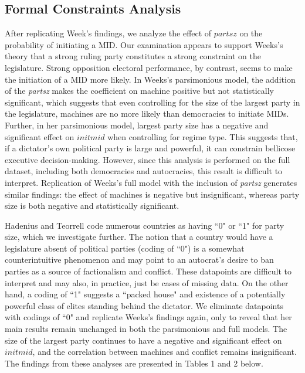 \documentclass[12pt]{article}
\begin{document}
\subsection{Formal Constraints Analysis} 

\par After replicating Week's findings, we analyze the effect of $partsz$ on the probability of initiating a MID. Our examination appears to support Weeks's theory that a strong ruling party constitutes a strong constraint on the legislature. Strong opposition electoral performance, by contrast, seems to make the initiation of a MID more likely. In Weeks's parsimonious model, the addition of the \textit{partsz} makes the coefficient on machine positive but not statistically significant, which suggests that even controlling for the size of the largest party in the legislature, machines are no more likely than democracies to initiate MIDs. Further, in her parsimonious model, largest party size has a negative and significant effect on $initmid$ when controlling for regime type. This suggests that, if a dictator's own political party is large and powerful, it can constrain bellicose executive decision-making. However, since this analysis is performed on the full dataset, including both democracies and autocracies, this result is difficult to interpret. Replication of Weeks's full model with the inclusion of \textit{partsz} generates similar findings: the effect of machines is negative but insignificant, whereas party size is both negative and statistically significant.

\par Hadenius and Teorrell code numerous countries as having ``0" or ``1" for party size, which we investigate further. The notion that a country would have a legislature absent of political parties (coding of ``0") is a somewhat counterintuitive phenomenon and may point to an autocrat's desire to ban parties as a source of factionalism and conflict. These datapoints are difficult to interpret and may also, in practice, just be cases of missing data. On the other hand, a coding of ``1" suggests a ``packed house" and existence of a potentially powerful class of elites standing behind the dictator. We eliminate datapoints with codings of ``0" and replicate Weeks's findings again, only to reveal that her main results remain unchanged in both the parsimonious and full models. The size of the largest party continues to have a negative and significant effect on $initmid$, and the correlation between machines and conflict remains insignificant. The findings from these analyses are presented in Tables 1 and 2 below.
\end{document}
